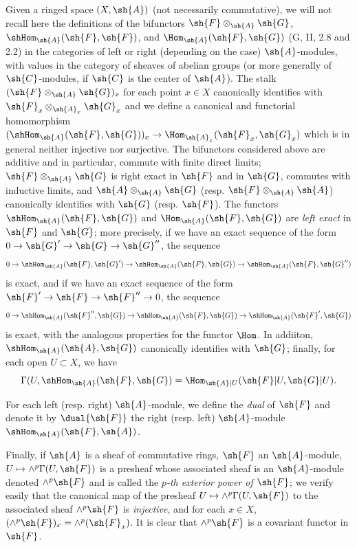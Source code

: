 \begin{env}[4.1.5]
\label{0.4.1.5}
Given a ringed space $(X,\sh{A})$ (not necessarily commutative), we will not
recall here the definitions of the bifunctors $\sh{F}\otimes_\sh{A}\sh{G}$,
$\shHom_\sh{A}(\sh{F},\sh{F})$, and $\Hom_\sh{A}(\sh{F},\sh{G})$
(G, II, 2.8 and 2.2) in the categories of left or right (depending on the case)
$\sh{A}$-modules, with values in the category of sheaves of abelian groups (or
more generally of $\sh{C}$-modules, if $\sh{C}$ is the center of $\sh{A}$). The
stalk $(\sh{F}\otimes_\sh{A}\sh{G})_x$ for each point $x\in X$ canonically
identifies with $\sh{F}_x\otimes_{\sh{A}_x}\sh{G}_x$ and we define a canonical
and functorial homomorphism
$(\shHom_\sh{A}(\sh{F},\sh{G}))_x\to\Hom_{\sh{A}_x}(\sh{F}_x,\sh{G}_x)$ which is
in general neither injective nor surjective. The bifunctors considered above are
additive and in particular, commute with finite direct limits;
$\sh{F}\otimes_\sh{A}\sh{G}$ is right exact in $\sh{F}$ and in $\sh{G}$,
commutes with inductive limits, and $\sh{A}\otimes_\sh{A}\sh{G}$
(resp. $\sh{F}\otimes_\sh{A}\sh{A}$) canonically identifies with $\sh{G}$
(resp. $\sh{F}$). The functors $\shHom_\sh{A}(\sh{F},\sh{G})$ and
$\Hom_\sh{A}(\sh{F},\sh{G})$ are \emph{left exact} in $\sh{F}$ and $\sh{G}$;
more precisely, if we have an exact sequence of the form
$0\to\sh{G}'\to\sh{G}\to\sh{G}''$, the sequence
\[
  0\to\shHom_\sh{A}(\sh{F},\sh{G}')\to
  \shHom_\sh{A}(\sh{F},\sh{G})\to\shHom_\sh{A}(\sh{F},\sh{G}'')
\]
is exact, and if we have an exact sequence of the form
$\sh{F}'\to\sh{F}\to\sh{F}''\to 0$, the sequence
\[
  0\to\shHom_\sh{A}(\sh{F}'',\sh{G})\to
  \shHom_\sh{A}(\sh{F},\sh{G})\to\shHom_\sh{A}(\sh{F}',\sh{G})
\]
is exact, with the analogous properties for the functor $\Hom$. In addiiton,
$\shHom_\sh{A}(\sh{A},\sh{G})$ canonically identifies with $\sh{G}$; finally,
for each open $U\subset X$, we have
\[
  \Gamma(U,\shHom_\sh{A}(\sh{F},\sh{G})=\Hom_{\sh{A}|U}(\sh{F}|U,\sh{G}|U).
\]

For each left (resp. right) $\sh{A}$-module, we define the \emph{dual} of
$\sh{F}$ and denote it by $\dual{\sh{F}}$ the right (resp. left) $\sh{A}$-module
$\shHom_\sh{A}(\sh{F},\sh{A})$.

Finally, if $\sh{A}$ is a sheaf of commutative rings, $\sh{F}$ an
$\sh{A}$-module, $U\mapsto\wedge^p\Gamma(U,\sh{F})$ is a presheaf whose
associated sheaf is an $\sh{A}$-module denoted $\wedge^p\sh{F}$ and is called
the \emph{$p$-th exterior power of $\sh{F}$}; we verify easily that the
canonical map of the presheaf $U\mapsto\wedge^p\Gamma(U,\sh{F})$ to the
associated sheaf $\wedge^p\sh{F}$ is \emph{injective}, and for each $x\in X$,
$(\wedge^p\sh{F})_x=\wedge^p(\sh{F}_x)$. It is clear that $\wedge^p\sh{F}$ is a
covariant functor in $\sh{F}$.
\end{env}

